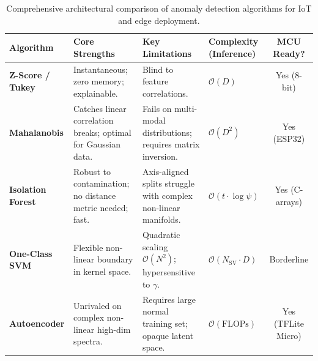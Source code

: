 \begin{table}[htbp]
\centering
\small
\begin{tabular}{lp{3.5cm}p{3.5cm}p{2.6cm}c}
\toprule
\textbf{Algorithm} & \textbf{Core Strengths} & \textbf{Key Limitations} & \textbf{Complexity (Inference)} & \textbf{MCU Ready?} \\
\midrule
\textbf{Z-Score / Tukey} & Instantaneous; zero memory; explainable. & Blind to feature correlations. & $\mathcal{O}(D)$ & Yes (8-bit) \\
\addlinespace[3pt]
\textbf{Mahalanobis} & Catches linear correlation breaks; optimal for Gaussian data. & Fails on multi-modal distributions; requires matrix inversion. & $\mathcal{O}(D^2)$ & Yes (ESP32) \\
\addlinespace[3pt]
\textbf{Isolation Forest} & Robust to contamination; no distance metric needed; fast. & Axis-aligned splits struggle with complex non-linear manifolds. & $\mathcal{O}(t \cdot \log \psi)$ & Yes (C-arrays) \\
\addlinespace[3pt]
\textbf{One-Class SVM} & Flexible non-linear boundary in kernel space. & Quadratic scaling $\mathcal{O}(N^2)$; hypersensitive to $\gamma$. & $\mathcal{O}(N_{\text{SV}} \cdot D)$ & Borderline \\
\addlinespace[3pt]
\textbf{Autoencoder} & Unrivaled on complex non-linear high-dim spectra. & Requires large normal training set; opaque latent space. & $\mathcal{O}(\text{FLOPs})$ & Yes (TFLite Micro) \\
\bottomrule
\end{tabular}
\caption{Comprehensive architectural comparison of anomaly detection algorithms for IoT and edge deployment.}\label{tab:anomaly_algorithm_comparison}
\end{table}

